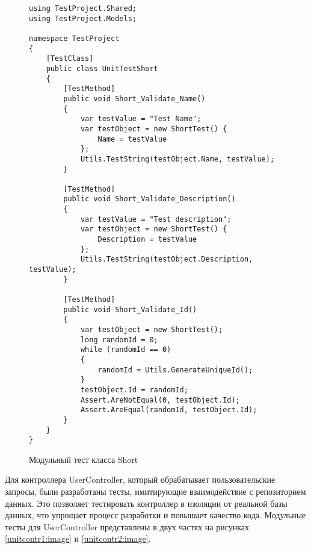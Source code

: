 \begin{figure}[ht]
\lstset{style=sharpc}
\begin{lstlisting}
using TestProject.Shared;
using TestProject.Models;

namespace TestProject
{
    [TestClass]
    public class UnitTestShort
    {
        [TestMethod]
        public void Short_Validate_Name()
        {
            var testValue = "Test Name";
            var testObject = new ShortTest() {
                Name = testValue
            };
            Utils.TestString(testObject.Name, testValue);
        }

        [TestMethod]
        public void Short_Validate_Description()
        {
            var testValue = "Test description";
            var testObject = new ShortTest() {
                Description = testValue
            };
            Utils.TestString(testObject.Description, testValue);
        }

        [TestMethod]
        public void Short_Validate_Id()
        {
            var testObject = new ShortTest();
            long randomId = 0;
            while (randomId == 0)
            {
                randomId = Utils.GenerateUniqueId();
            }
            testObject.Id = randomId;
            Assert.AreNotEqual(0, testObject.Id);
            Assert.AreEqual(randomId, testObject.Id);
        }
    }
}  
\end{lstlisting}
\caption{Модульный тест класса Short}
\label{unitshort1:image}
\end{figure}

Для контроллера UserController, который обрабатывает пользовательские запросы, были разработаны тесты, имитирующие взаимодействие с репозиторием данных. Это позволяет тестировать контроллер в изоляции от реальной базы данных, что упрощает процесс разработки и повышает качество кода.
Модульные тесты для UserController представлены в двух частях на рисунках \ref{unitcontr1:image} и \ref{unitcontr2:image}.

